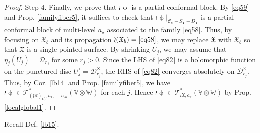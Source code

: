 \documentclass[11pt,b5paper,notitlepage]{article}
\theoremstyle{definition}
\newtheorem{rem}[df]{Remark}
\theoremstyle{plain}
\newcommand{\fk}{\mathfrak}
\newcommand{\mc}{\mathcal}
\newcommand{\SV}{\mathscr{V}}
\newcommand{\scr}{\mathscr}
\newcommand{\SX}{{S_{\fk X}}}
\newcommand{\DX}{D_{\fk X}}
\newcommand{\blt}{\bullet}
\newcommand{\Vbb}{\mathbb V}
\newcommand{\Wbb}{\mathbb W}
\newcommand{\Cbb}{\mathbb C}
\newcommand{\<}{\left\langle}
\renewcommand{\>}{\right\rangle}
\newcommand{\MO}{\mathcal{O}}
\newcommand{\MC}{\mathcal{C}}
\newcommand{\fx}{\mathfrak{X}}
\newcommand{\SW}{\mathscr{W}}
\newcommand{\MD}{\mathcal{D}}
\numberwithin{equation}{section}
\begin{document}
\begin{proof}
Step 4. Finally, we prove that $\wr \upphi$ is a partial conformal block. By \eqref{eq59} and Prop. \ref{familyfiber5}, it suffices to check that $\wr\upphi|_{\mc C_b-\SX-\DX}$ is a partial conformal block of multi-level $a_\star$ associated to the family \eqref{eq58}. Thus, by focusing on $\fk X_b$ and its propagation $\wr(\fk X_b)=\eqref{eq58}$, we may replace $\fk X$ with $\fk X_b$ so that $\fk X$ is a single pointed surface. By  shrinking $U_j$, we may assume that $\eta_j(U_j)=\MD_{r_j}$ for some $r_j>0$. Since the LHS of \eqref{eq82} is a holomorphic function on the punctured disc $U_j^\circ=\mc D_{r_j}^\times$, the RHS of \eqref{eq82} converges absolutely on $\mc D_{r_j}^\times$. Thus, by Cor. \ref{lb14} and Prop. \ref{familyfiber5}, we have $\wr\upphi\in\scr T_{(\wr{\fk X})_{U_j^\circ},a_1,\dots,a_M}^*(\Vbb\otimes\Wbb)$ for each $j$. Hence $\wr\upphi\in\scr T_{\wr{\fk X},a_\star}^*(\Vbb\otimes\Wbb)$ by Prop. \ref{localglobal1}.
\end{proof}

Recall Def. \ref{lb15}.
\end{document}
